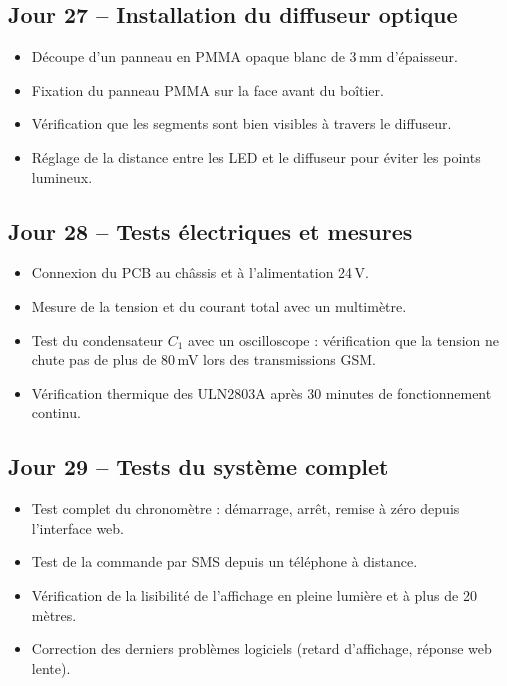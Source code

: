 \documentclass[12pt,a4paper]{article}
\begin{document}
\subsection*{Jour 27 -- Installation du diffuseur optique}
\begin{itemize}
    \item Découpe d'un panneau en PMMA opaque blanc de 3\,mm d'épaisseur.
    \item Fixation du panneau PMMA sur la face avant du boîtier.
    \item Vérification que les segments sont bien visibles à travers le diffuseur.
    \item Réglage de la distance entre les LED et le diffuseur pour éviter les points lumineux.
\end{itemize}

\subsection*{Jour 28 -- Tests électriques et mesures}
\begin{itemize}
    \item Connexion du PCB au châssis et à l'alimentation 24\,V.
    \item Mesure de la tension et du courant total avec un multimètre.
    \item Test du condensateur $C_1$ avec un oscilloscope : vérification que la tension ne chute pas de plus de 80\,mV lors des transmissions GSM.
    \item Vérification thermique des ULN2803A après 30 minutes de fonctionnement continu.
\end{itemize}

\subsection*{Jour 29 -- Tests du système complet}
\begin{itemize}
    \item Test complet du chronomètre : démarrage, arrêt, remise à zéro depuis l'interface web.
    \item Test de la commande par SMS depuis un téléphone à distance.
    \item Vérification de la lisibilité de l'affichage en pleine lumière et à plus de 20 mètres.
    \item Correction des derniers problèmes logiciels (retard d'affichage, réponse web lente).
\end{itemize}
\end{document}

